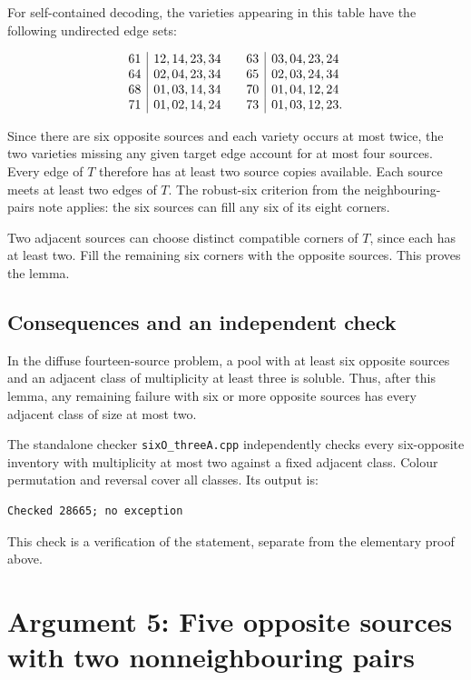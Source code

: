 \documentclass[
  10pt,
]{article}
\begin{document}
For self-contained decoding, the varieties appearing in this table have
the following undirected edge sets:

\[
\begin{array}{c|l@{\qquad}c|l}
61&12,14,23,34&63&03,04,23,24\\
64&02,04,23,34&65&02,03,24,34\\
68&01,03,14,34&70&01,04,12,24\\
71&01,02,14,24&73&01,03,12,23.
\end{array}
\]

Since there are six opposite sources and each variety occurs at most
twice, the two varieties missing any given target edge account for at
most four sources. Every edge of \(T\) therefore has at least two source
copies available. Each source meets at least two edges of \(T\). The
robust-six criterion from the neighbouring-pairs note applies: the six
sources can fill any six of its eight corners.

Two adjacent sources can choose distinct compatible corners of \(T\),
since each has at least two. Fill the remaining six corners with the
opposite sources. This proves the lemma.

\hypertarget{consequences-and-an-independent-check}{%
\subsection*{Consequences and an independent
check}\label{consequences-and-an-independent-check}}

In the diffuse fourteen-source problem, a pool with at least six
opposite sources and an adjacent class of multiplicity at least three is
soluble. Thus, after this lemma, any remaining failure with six or more
opposite sources has every adjacent class of size at most two.

The standalone checker \texttt{sixO\_threeA.cpp} independently checks
every six-opposite inventory with multiplicity at most two against a
fixed adjacent class. Colour permutation and reversal cover all classes.
Its output is:

\begin{verbatim}
Checked 28665; no exception
\end{verbatim}

This check is a verification of the statement, separate from the
elementary proof above.

\hypertarget{arg-5}{%
\section{Argument 5: Five opposite sources with two nonneighbouring
pairs}\label{arg-5}}
\end{document}
